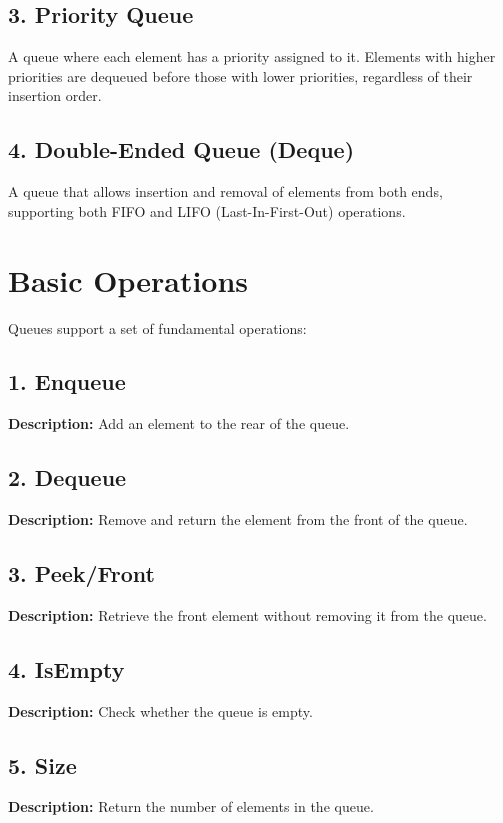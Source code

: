 \subsection*{3. Priority Queue}
A queue where each element has a priority assigned to it. Elements with higher priorities are dequeued before those with lower priorities, regardless of their insertion order.

\subsection*{4. Double-Ended Queue (Deque)}
A queue that allows insertion and removal of elements from both ends, supporting both FIFO and LIFO (Last-In-First-Out) operations.

\section{Basic Operations}

Queues support a set of fundamental operations:

\subsection*{1. Enqueue}
\textbf{Description:} Add an element to the rear of the queue.

\subsection*{2. Dequeue}
\textbf{Description:} Remove and return the element from the front of the queue.

\subsection*{3. Peek/Front}
\textbf{Description:} Retrieve the front element without removing it from the queue.

\subsection*{4. IsEmpty}
\textbf{Description:} Check whether the queue is empty.

\subsection*{5. Size}
\textbf{Description:} Return the number of elements in the queue.


